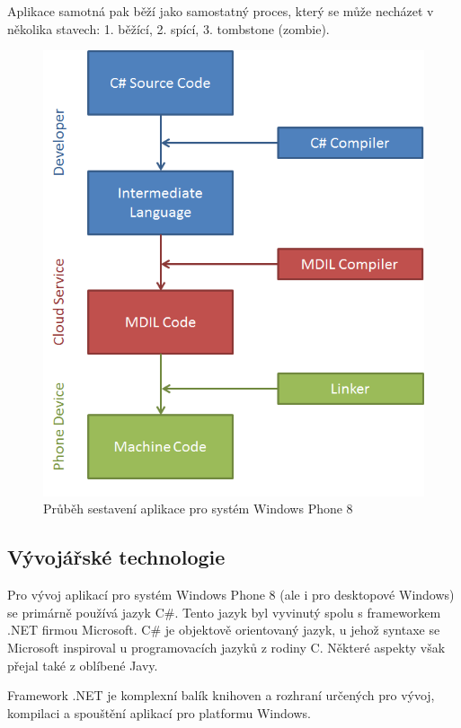Aplikace samotná pak běží jako samostatný proces, který se může necházet v několika stavech: 1. běžící, 2. spící, 3. tombstone (zombie).

\begin{figure}\centering
\includegraphics[width=1.0\textwidth]{wp8_cloud_compilation.png}
\caption{Průběh sestavení aplikace pro systém Windows Phone 8 \cite{wp8_compile_cloud}}
\label{fig:WP8Compilation}
\end{figure}

\subsection{Vývojářské technologie}
Pro vývoj aplikací pro systém Windows Phone 8 (ale i pro desktopové Windows) se primárně používá jazyk C\#. Tento jazyk byl vyvinutý spolu s frameworkem .NET firmou Microsoft. C\# je objektově orientovaný jazyk, u jehož syntaxe se Microsoft inspiroval u programovacích jazyků z rodiny C. Některé aspekty však přejal také z oblíbené Javy.

Framework .NET je komplexní balík knihoven a rozhraní určených pro vývoj, kompilaci a spouštění aplikací pro platformu Windows.


